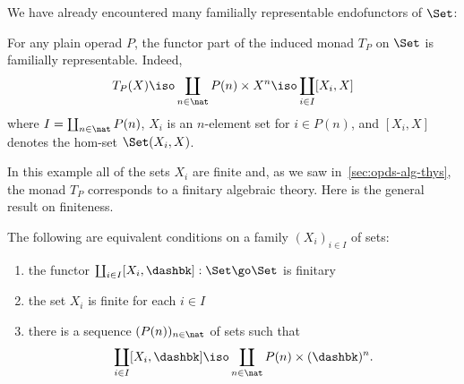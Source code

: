We have already encountered many familially representable endofunctors of
$\Set$:
%
\begin{example}
For any plain operad $P$, the functor part of the induced monad $T_P$
on $\Set$ is familially representable.  Indeed,
\[
T_P(X) 
\iso \coprod_{n\in\nat} P(n) \times X^n
\iso \coprod_{i\in I} [X_i, X]
\]
where $I=\coprod_{n\in\nat} P(n)$, $X_i$ is an $n$-element set for $i\in
P(n)$, and $[X_i,X]$%
% 
% 
denotes the hom-set $\Set(X_i,X)$.
\end{example}
%
In this example all of the sets $X_i$ are finite and, as we saw
in~\ref{sec:opds-alg-thys}, the monad $T_P$ corresponds to a finitary
algebraic theory.  Here is the general result on finiteness.%
%
%
%
%
\begin{propn}	
The following are equivalent conditions on a family $(X_i)_{i\in I}$ of
sets:
%
\begin{enumerate}
\item	{}
the functor $\coprod_{i\in I} [X_i, \dashbk]: \Set \go \Set$ is finitary
\item	{}
the set $X_i$ is finite for each $i\in I$
\item	{}
there is a sequence $(P(n))_{n\in\nat}$ of sets such that 
\[
\coprod_{i\in I} [X_i, \dashbk] 
\iso 
\coprod_{n\in\nat} P(n) \times (\dashbk)^n.
\]
\end{enumerate}
\end{propn}
%
